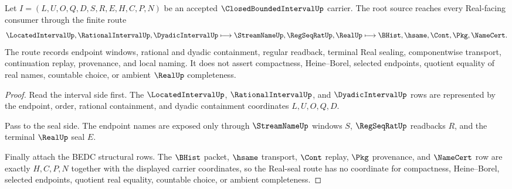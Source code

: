 \begin{theorem}
\label{thm:closed-bounded-interval-root-source-real-seal-route}
Let $I=(L,U,O,Q,D,S,R,E,H,C,P,N)$ be an accepted $\ClosedBoundedIntervalUp$ carrier. The root source reaches every Real-facing consumer through the finite route
$$
\LocatedIntervalUp,\RationalIntervalUp,\DyadicIntervalUp \longmapsto \StreamNameUp,\RegSeqRatUp,\RealUp \longmapsto \BHist,\hsame,\Cont,\Pkg,\NameCert .
$$
The route records endpoint windows, rational and dyadic containment, regular readback, terminal Real sealing, componentwise transport, continuation replay, provenance, and local naming. It does not assert compactness, Heine--Borel, selected endpoints, quotient equality of real names, countable choice, or ambient $\RealUp$ completeness.
\end{theorem}
\begin{proof}
Read the interval side first. The $\LocatedIntervalUp$, $\RationalIntervalUp$, and $\DyadicIntervalUp$ rows are represented by the endpoint, order, rational containment, and dyadic containment coordinates $L,U,O,Q,D$.

Pass to the seal side. The endpoint names are exposed only through $\StreamNameUp$ windows $S$, $\RegSeqRatUp$ readbacks $R$, and the terminal $\RealUp$ seal $E$.

Finally attach the BEDC structural rows. The $\BHist$ packet, $\hsame$ transport, $\Cont$ replay, $\Pkg$ provenance, and $\NameCert$ row are exactly $H,C,P,N$ together with the displayed carrier coordinates, so the Real-seal route has no coordinate for compactness, Heine--Borel, selected endpoints, quotient real equality, countable choice, or ambient completeness.
\end{proof}

